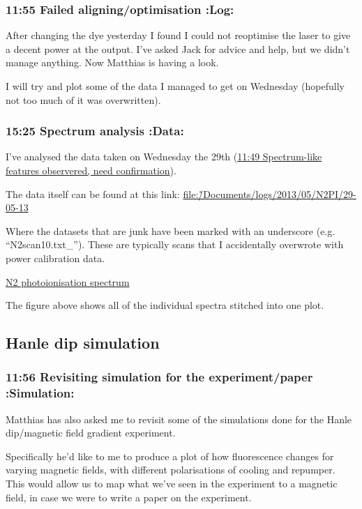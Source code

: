 \documentclass[11pt]{article}
\begin{document}
\subsubsection*{11:55 Failed aligning/optimisation \textbf{:Log:}}
\label{sec-15-1-1}

After changing the dye yesterday I found I could not reoptimise the
laser to give a decent power at the output. I've asked Jack for advice
and help, but we didn't manage anything. Now Matthias is having a
look. 

I will try and plot some of the data I managed to get on Wednesday
(hopefully not too much of it was overwritten).
\subsubsection*{15:25 Spectrum analysis \textbf{:Data:}}
\label{sec-15-1-2}

I've analysed the data taken on Wednesday the 29th (\hyperref[sec-13-1-2]{11:49 Spectrum-like features observered, need confirmation}). 

The data itself can be found at this link:
\href{file:///home/nicolas/Documents/logs/2013/05/N2PI/29-05-13}{file:\~/Documents/logs/2013/05/N2PI/29-05-13} 

Where the datasets that are junk have been marked with an underscore
(e.g. ``N2scan10.txt\_''). These are typically scans that I accidentally
overwrote with power calibration data. 

\href{file:///home/nicolas/Documents/logs/2013/05/N2PI_spec.png}{N2 photoionisation spectrum}

The figure above shows all of the individual spectra stitched into one
plot. 
\subsection*{Hanle dip simulation}
\label{sec-15-2}
\subsubsection*{11:56 Revisiting simulation for the experiment/paper \textbf{:Simulation:}}
\label{sec-15-2-1}

Matthias has also asked me to revisit some of the simulations done for
the Hanle dip/magnetic field gradient experiment.

Specifically he'd like to me to produce a plot of how fluorescence
changes for varying magnetic fields, with different polarisations of
cooling and repumper. This would allow us to map what we've seen in
the experiment to a magnetic field, in case we were to write a paper
on the experiment.
\end{document}
